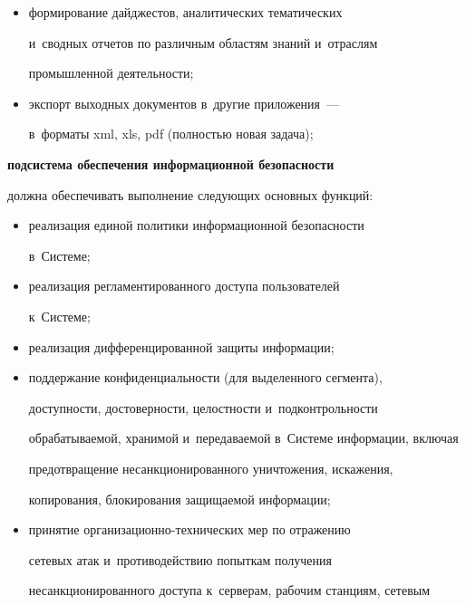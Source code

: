\begin{description}
\begin{itemize}
пользователей по обработке хранящейся в~Системе информации;


     \item формирование дайджестов, аналитических тематических 


и~сводных отчетов по различным областям знаний и~отраслям 


промышленной деятельности;


     \item экспорт выходных документов в~другие приложения~--- 


в~форматы xml, xls, pdf (полностью новая задача);


     \end{itemize}


     


 \item[\,]    \textbf{подсистема обеспечения информационной безопасности} 


должна обеспечивать выполнение следующих основных функций:


     \begin{itemize}


     \item  реализация единой политики информационной безопасности 


в~Системе;


     \item реализация регламентированного доступа пользователей 


к~Системе;


     \item реализация дифференцированной защиты информации;


     \item поддержание конфиденциальности (для выделенного сегмента), 


доступности, достоверности, целостности и~подконтрольности 


обрабатываемой, хранимой и~передаваемой в~Системе информации, включая 


предотвращение несанкционированного уничтожения, искажения, 


копирования, блокирования защищаемой информации;


     \item принятие организационно-технических мер по отражению 


сетевых атак и~противодействию попыткам получения 


несанкционированного доступа к~серверам, рабочим станциям, сетевым 



\end{itemize}
\end{description}
